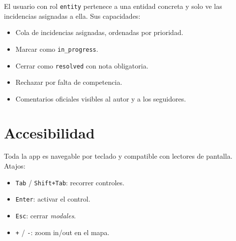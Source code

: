 El usuario con rol \texttt{entity} pertenece a una entidad concreta y solo ve las incidencias asignadas a ella. Sus capacidades:

\begin{itemize}[leftmargin=1.2cm, itemsep=2pt]
  \item Cola de incidencias asignadas, ordenadas por prioridad.
  \item Marcar como \texttt{in\_progress}.
  \item Cerrar como \texttt{resolved} con nota obligatoria.
  \item Rechazar por falta de competencia.
  \item Comentarios oficiales visibles al autor y a los seguidores.
\end{itemize}


\section{Accesibilidad}
\label{sec:manual-accesibilidad}

Toda la app es navegable por teclado y compatible con lectores de pantalla. Atajos:

\begin{itemize}[leftmargin=1.2cm, itemsep=2pt]
  \item \texttt{Tab} / \texttt{Shift+Tab}: recorrer controles.
  \item \texttt{Enter}: activar el control.
  \item \texttt{Esc}: cerrar \textit{modales}.
  \item \texttt{+} / \texttt{-}: zoom in/out en el mapa.
\end{itemize}
